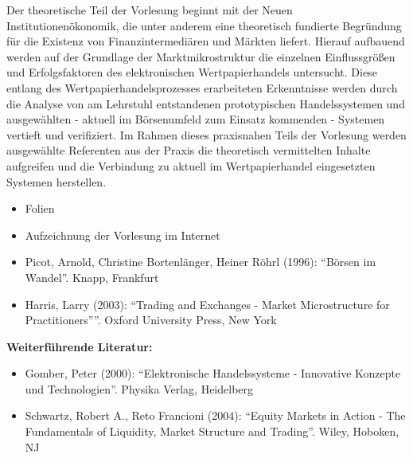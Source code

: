 \begin{course}
\begin{content}
Der theoretische Teil der Vorlesung beginnt mit der Neuen Institutionenökonomik, die unter anderem eine theoretisch fundierte Begründung für die Existenz von Finanzintermediären und Märkten liefert. Hierauf aufbauend werden auf der Grundlage der Marktmikrostruktur die einzelnen Einflussgrößen und Erfolgsfaktoren des elektronischen Wertpapierhandels untersucht. Diese entlang des Wertpapierhandelsprozesses erarbeiteten Erkenntnisse werden durch die Analyse von am Lehrstuhl entstandenen prototypischen Handelssystemen und ausgewählten - aktuell im Börsenumfeld zum Einsatz kommenden - Systemen vertieft und verifiziert. Im Rahmen dieses praxisnahen Teils der Vorlesung werden ausgewählte Referenten aus der Praxis die theoretisch vermittelten Inhalte aufgreifen und die Verbindung zu aktuell im Wertpapierhandel eingesetzten Systemen herstellen.


\end{content}

\begin{media}\begin{itemize}\item Folien  \item Aufzeichnung der Vorlesung im Internet  \end{itemize}\end{media}

\begin{literature}\begin{itemize}\item Picot, Arnold, Christine Bortenlänger, Heiner Röhrl (1996): “Börsen im Wandel”. Knapp, Frankfurt  \item Harris, Larry (2003): “Trading and Exchanges - Market Microstructure for Practitioners””. Oxford University Press, New York  \end{itemize}

\textbf{Weiterführende Literatur:}

 \begin{itemize}\item Gomber, Peter (2000): “Elektronische Handelssysteme - Innovative Konzepte und Technologien”. Physika Verlag, Heidelberg  \item Schwartz, Robert A., Reto Francioni (2004): “Equity Markets in Action - The Fundamentals of Liquidity, Market Structure and Trading”. Wiley, Hoboken, NJ  \end{itemize}\end{literature}



\end{course}